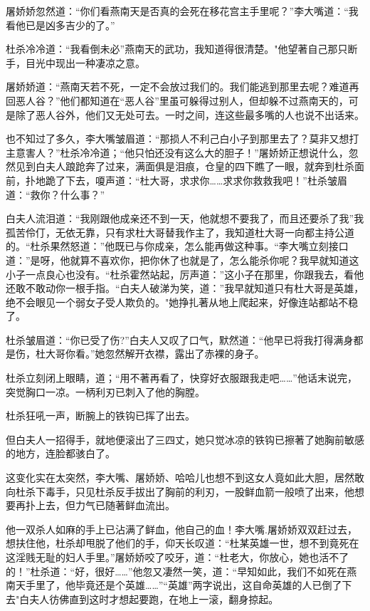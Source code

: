 \documentclass[12pt,oneside]{book}
\begin{document}
屠娇娇忽然道：``你们看燕南天是否真的会死在移花宫主手里呢？''李大嘴道：``我看他已是凶多吉少的了。''

杜杀冷冷道：``我看倒未必''燕南天的武功，我知道得很清楚。"他望著自己那只断手，目光中现出一种凄凉之意。

屠娇娇道：``燕南天若不死，一定不会放过我们的。我们能逃到那里去呢？难道再回恶人谷？''他们都知道在``恶人谷''里虽可躲得过别人，但却躲不过燕南天的，可是除了恶人谷外，他们又无处可去。一时之间，连这些最多嘴的人也说不出话来。

也不知过了多久，李大嘴皱眉道：``那损人不利己白小子到那里去了？莫非又想打主意害人？''杜杀冷冷道；``他只怕还没有这么大的胆子！''屠娇娇正想说什么，忽然见到白夫人踉跄奔了过来，满面俱是泪痕，仓皇的四下瞧了一眼，就奔到杜杀面前，扑地跪了下去，嗄声道：``杜大哥，求求你\ldots\ldots 求求你救救我吧！''杜杀皱眉道：``救你？什么事？''

白夫人流泪道：``我刚跟他成亲还不到一天，他就想不要我了，而且还要杀了我''我孤苦伶仃，无依无靠，只有求杜大哥替我作主了，我知道杜大哥一向都主持公道的。``杜杀果然怒道：''他既已与你成亲，怎么能再做这种事。``李大嘴立刻接口道：''是呀，他就算不喜欢你，把你休了也就是了，怎么能杀你呢？我早就知道这小子一点良心也没有。``杜杀霍然站起，厉声道：''这小子在那里，你跟我去，看他还敢不敢动你一根手指。``白夫人破涕为笑，道：''我早就知道只有杜大哥是英雄，绝不会眼见一个弱女子受人欺负的。"她挣扎著从地上爬起来，好像连站都站不稳了。

杜杀皱眉道：``你已受了伤?''白夫人又叹了口气，默然道：``他早已将我打得满身都是伤，杜大哥你看。''她忽然解开衣襟，露出了赤裸的身子。

杜杀立刻闭上眼睛，道；``用不著再看了，快穿好衣服跟我走吧\ldots\ldots{}''他话末说完，突觉胸口一凉。一柄利刃已刺入了他的胸膛。

杜杀狂吼一声，断腕上的铁钩已挥了出去。

但白夫人一招得手，就地便滚出了三四丈，她只觉冰凉的铁钩已擦著了她胸前敏感的地方，连脸都骇白了。

这变化实在太突然，李大嘴、屠娇娇、哈哈儿也想不到这女人竟如此大胆，居然敢向杜杀下毒手，只见杜杀反手拔出了胸前的利刃，一股鲜血箭一般喷了出来，他想要再扑上去，但力气已随著鲜血流出。

他一双杀人如麻的手上已沾满了鲜血，他自己的血！李大嘴.屠娇娇双双赶过去，想扶住他，杜杀却甩脱了他们的手，仰天长叹道：``杜某英雄一世，想不到竟死在这淫贱无耻的妇人手里。''屠娇娇咬了咬牙，道：``杜老大，你放心，她也活不了的！''杜杀道：``好，很好\ldots\ldots{}''他忽又凄然一笑，道：``早知如此，我们不如死在燕南天手里了，他毕竟还是个英雄\ldots\ldots{}''``英雄''两字说出，这自命英雄的人已倒了下去"白夫人彷佛直到这时才想起要跑，在地上一滚，翻身掠起。
\end{document}
